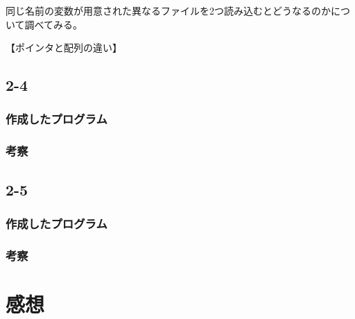 \documentclass[a4j,11pt]{jarticle}
\begin{document}
同じ名前の変数が用意された異なるファイルを2つ読み込むとどうなるのかについて調べてみる。


【ポインタと配列の違い】

 \subsection{2-4}

  \subsubsection{作成したプログラム}

  \subsubsection{考察}

 \subsection{2-5}

  \subsubsection{作成したプログラム}

  \subsubsection{考察}

\section{感想}
\end{document}
